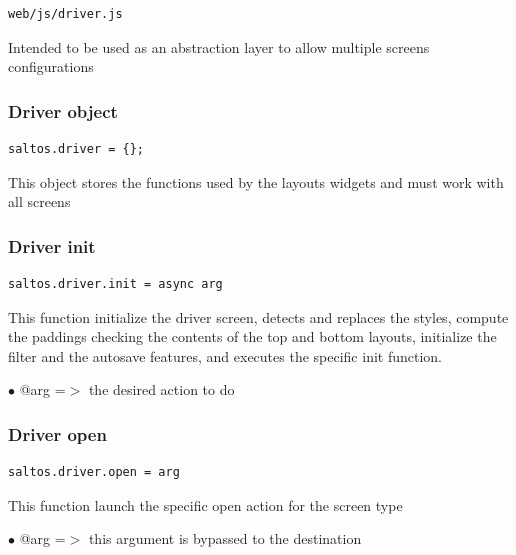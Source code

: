 \documentclass[a4paper]{article}
\begin{document}
\begin{lstlisting}
web/js/driver.js
\end{lstlisting}

Intended to be used as an abstraction layer to allow multiple screens configurations

\hypertarget{toc167}{}
\subsubsection{Driver object}

\begin{lstlisting}
saltos.driver = {};
\end{lstlisting}

This object stores the functions used by the layouts widgets and must work with all screens

\hypertarget{toc168}{}
\subsubsection{Driver init}

\begin{lstlisting}
saltos.driver.init = async arg
\end{lstlisting}

This function initialize the driver screen, detects and replaces the styles, compute
the paddings checking the contents of the top and bottom layouts, initialize the filter
and the autosave features, and executes the specific init function.

\begin{compactitem}
\item[\color{myblue}$\bullet$] @arg =$>$ the desired action to do
\end{compactitem}

\hypertarget{toc169}{}
\subsubsection{Driver open}

\begin{lstlisting}
saltos.driver.open = arg
\end{lstlisting}

This function launch the specific open action for the screen type

\begin{compactitem}
\item[\color{myblue}$\bullet$] @arg =$>$ this argument is bypassed to the destination
\end{compactitem}
\end{document}
